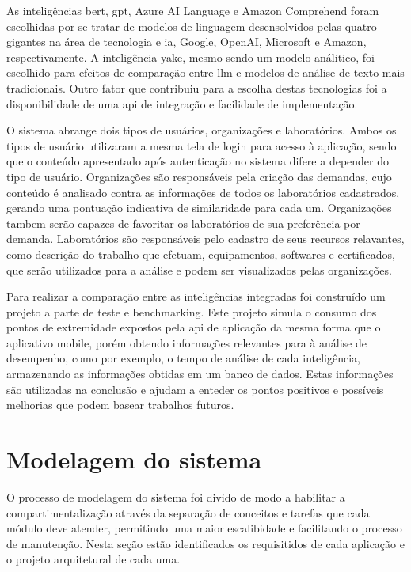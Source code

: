 As inteligências \gls{bert}, \gls{gpt}, Azure AI Language e Amazon Comprehend foram escolhidas por se tratar de modelos de linguagem desensolvidos pelas quatro gigantes na área de tecnologia e \gls{ia}, Google, OpenAI, Microsoft e Amazon, respectivamente. A inteligência \gls{yake}, mesmo sendo um modelo análitico, foi escolhido para efeitos de comparação entre \gls{llm} e modelos de análise de texto mais tradicionais. Outro fator que contribuiu para a escolha destas tecnologias foi a disponibilidade de uma \gls{api} de integração e facilidade de implementação.

O sistema abrange dois tipos de usuários, organizações e laboratórios. Ambos os tipos de usuário utilizaram a mesma tela de login para acesso à aplicação, sendo que o conteúdo apresentado após autenticação no sistema difere a depender do tipo de usuário. Organizações são responsáveis pela criação das demandas, cujo conteúdo é analisado contra as informações de todos os laboratórios cadastrados, gerando uma pontuação indicativa de similaridade para cada um. Organizações tambem serão capazes de favoritar os laboratórios de sua preferência por demanda. Laboratórios são responsáveis pelo cadastro de seus recursos relavantes, como descrição do trabalho que efetuam, equipamentos, softwares e certificados, que serão utilizados para a análise e podem ser visualizados pelas organizações.

Para realizar a comparação entre as inteligências integradas foi construído um projeto a parte de teste e benchmarking. Este projeto simula o consumo dos pontos de extremidade expostos pela \gls{api} de aplicação da mesma forma que o aplicativo mobile, porém obtendo informações relevantes para à análise de desempenho, como por exemplo, o tempo de análise de cada inteligência, armazenando as informações obtidas em um banco de dados. Estas informações são utilizadas na conclusão e ajudam a enteder os pontos positivos e possíveis melhorias que podem basear trabalhos futuros.


\section{Modelagem do sistema}\label{sec:modelagem}

O processo de modelagem do sistema foi divido de modo a habilitar a compartimentalização através da separação de conceitos e tarefas que cada módulo deve atender, permitindo uma maior escalibidade e facilitando o processo de manutenção. Nesta seção estão identificados os requisitidos de cada aplicação e o projeto arquitetural de cada uma.

